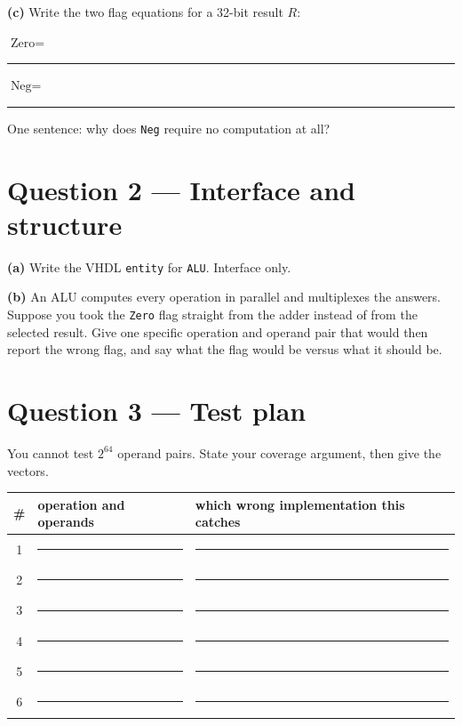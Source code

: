 \documentclass[11pt]{article}
\newcommand{\code}[1]{\texttt{#1}}
\newcommand{\answerbox}[1]{\vspace{2pt}\fbox{\parbox[c][#1][c]{\dimexpr\linewidth-2\fboxsep-2\fboxrule}{\ }}\vspace{4pt}}
\begin{document}
\answerbox{2.0cm}

\textbf{(c)} Write the two flag equations for a 32-bit result $R$:

\vspace{4pt}
$\text{Zero} = $ \rule{9cm}{0.4pt}
\vspace{8pt}

$\text{Neg} = $ \rule{9cm}{0.4pt}
\vspace{6pt}

One sentence: why does \code{Neg} require no computation at all?

\answerbox{1.2cm}

\section*{Question 2 --- Interface and structure}

\textbf{(a)} Write the VHDL \code{entity} for \code{ALU}. Interface only.

\answerbox{4.2cm}

\textbf{(b)} An ALU computes every operation in parallel and multiplexes the
answers. Suppose you took the \code{Zero} flag straight from the adder instead
of from the selected result. Give one specific operation and operand pair that
would then report the wrong flag, and say what the flag would be versus what it
should be.

\answerbox{2.2cm}

\section*{Question 3 --- Test plan}

You cannot test $2^{64}$ operand pairs. State your coverage argument, then give
the vectors.

\begin{center}
\begin{tabular}{@{}c@{\hskip 8pt}p{4.6cm}@{\hskip 8pt}p{8.0cm}@{}}
\toprule
\# & operation and operands & which wrong implementation this catches \\
\midrule
1 & \rule{4.4cm}{0.4pt} & \rule{7.8cm}{0.4pt} \\[8pt]
2 & \rule{4.4cm}{0.4pt} & \rule{7.8cm}{0.4pt} \\[8pt]
3 & \rule{4.4cm}{0.4pt} & \rule{7.8cm}{0.4pt} \\[8pt]
4 & \rule{4.4cm}{0.4pt} & \rule{7.8cm}{0.4pt} \\[8pt]
5 & \rule{4.4cm}{0.4pt} & \rule{7.8cm}{0.4pt} \\[8pt]
6 & \rule{4.4cm}{0.4pt} & \rule{7.8cm}{0.4pt} \\
\bottomrule
\end{tabular}
\end{center}
\end{document}
